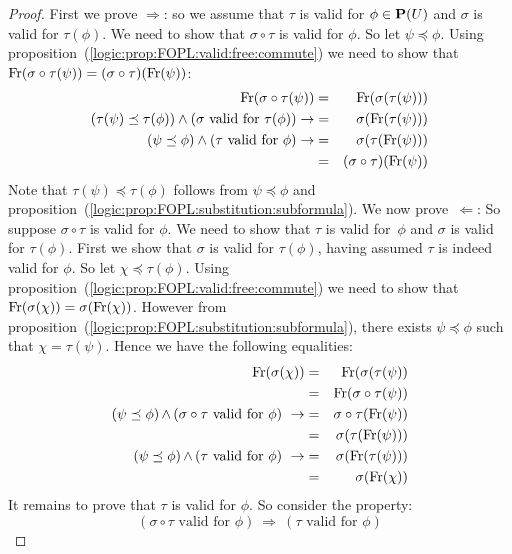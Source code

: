 \begin{proof}
First we prove $\Rightarrow$: so we assume that $\tau$ is valid for
$\phi\in{\bf P}(U)$ and $\sigma$ is valid for $\tau(\phi)$. We need
to show that $\sigma\circ\tau$ is valid for $\phi$. So let
$\psi\preceq\phi$. Using
proposition~(\ref{logic:prop:FOPL:valid:free:commute}) we need to
show that $\mbox{\rm Fr}(\sigma\circ\tau(\psi))
=(\sigma\circ\tau)(\mbox{\rm Fr}(\psi))$:
    \begin{eqnarray*}
    \mbox{\rm Fr}(\sigma\circ\tau(\psi))&=&\mbox{\rm Fr}(\sigma(\tau(\psi)))\\
   (\tau(\psi)\preceq\tau(\phi))\land(\mbox{$\sigma$ valid for $\tau(\phi)$})\rightarrow
   &=&\sigma(\mbox{\rm Fr}(\tau(\psi)))\\
   (\psi\preceq\phi)\land(\mbox{$\tau$ valid for $\phi$})
   \rightarrow&=&\sigma(\tau(\mbox{\rm Fr}(\psi)))\\
   &=&(\sigma\circ\tau)(\mbox{\rm Fr}(\psi))
    \end{eqnarray*}
Note that $\tau(\psi)\preceq\tau(\phi)$ follows from
$\psi\preceq\phi$ and
proposition~(\ref{logic:prop:FOPL:substitution:subformula}). We now
prove~$\Leftarrow$: So suppose $\sigma\circ\tau$ is valid for
$\phi$. We need to show that $\tau$ is valid for~$\phi$ and $\sigma$
is valid for $\tau(\phi)$. First we show that $\sigma$ is valid for
$\tau(\phi)$, having assumed $\tau$ is indeed valid for $\phi$. So
let $\chi\preceq\tau(\phi)$. Using
proposition~(\ref{logic:prop:FOPL:valid:free:commute}) we need to
show that $\mbox{\rm Fr}(\sigma(\chi))=\sigma(\mbox{\rm Fr}(\chi))$. However from
proposition~(\ref{logic:prop:FOPL:substitution:subformula}), there
exists $\psi\preceq\phi$ such that $\chi=\tau(\psi)$. Hence we have
the following equalities:
    \begin{eqnarray*}
    \free(\sigma(\chi))&=&\free(\sigma(\tau(\psi))\\
    &=&\free(\sigma\circ\tau(\psi))\\
    \mbox{($\psi\preceq\phi$)$\,\land\,$($\sigma\circ\tau$ valid for $\phi$)}\ \rightarrow
    &=&\sigma\circ\tau(\free(\psi))\\
    &=&\sigma(\tau(\free(\psi)))\\
    \mbox{($\psi\preceq\phi$)$\,\land\,$($\tau$ valid for $\phi$)}\ \rightarrow
    &=&\sigma(\free(\tau(\psi)))\\
    &=&\sigma(\free(\chi))
    \end{eqnarray*}
It remains to prove that $\tau$ is valid for $\phi$. So consider the
property:
    \[
    (\mbox{$\sigma\circ\tau$ valid for
    $\phi$})\ \Rightarrow\ (\mbox{$\tau$ valid for $\phi$})
\]
\end{proof}
